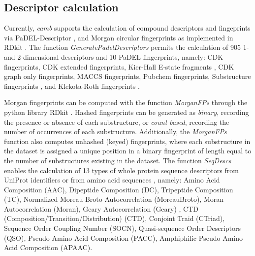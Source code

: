 \documentclass[twoside,a4wide,10pt]{article}
\begin{document}
\subsection{Descriptor calculation} 

Currently, {\it camb} supports the calculation of compound descriptors and fingeprints via PaDEL-Descriptor \citep{padel},
and Morgan circular fingerprints \citep{extended_fp} as implemented in RDkit \citep{rdkit}.
The function {\it GeneratePadelDescriptors} permits the calculation of 905 1- and 2-dimensional descriptors and 10 PaDEL fingerprints, namely: 
CDK fingerprints, CDK extended fingerprints, Kier-Hall E-state fragments \cite{state_fp}, CDK graph only fingerprints, MACCS fingerprints,
Pubchem fingerprints, Substructure fingerprints \citep{obabel}, and Klekota-Roth fingerprints \citep{privileged_substructures}.

Morgan fingerprints can be computed with the function {\it MorganFPs}
through the python library RDkit \citep{rdkit}.
Hashed fingerprints can be generated as \textit{binary}, recording the presence or absence of each substructure,
 or \textit{count based}, recording the number of occurrences of each substructure.
Additionally, the {\it MorganFPs} function also computes unhashed (keyed) fingerprints, 
where each substructure in the dataset is assigned a unique position in a binary fingerprint of length equal to the number of substructures existing in the dataset.
The function {\it SeqDescs} enables the calculation of 13 types of whole protein sequence descriptors
from UniProt identifiers or from amino acid sequences \citep{protr}, namely:
Amino Acid Composition (AAC), Dipeptide Composition (DC), Tripeptide Composition (TC), Normalized Moreau-Broto Autocorrelation (MoreauBroto), Moran Autocorrelation (Moran), Geary Autocorrelation (Geary) , CTD (Composition/Transition/Distribution) (CTD), Conjoint Traid (CTriad), Sequence Order Coupling Number (SOCN), Quasi-sequence Order Descriptors (QSO), Pseudo Amino Acid Composition (PACC), Amphiphilic Pseudo Amino Acid Composition (APAAC).
\end{document}
